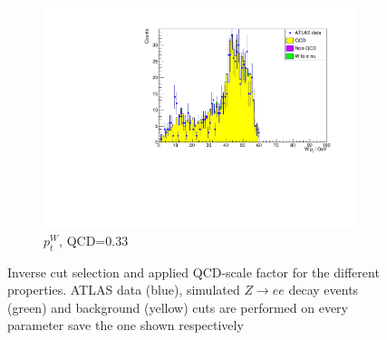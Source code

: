 \documentclass[11pt,a4paper,notitlepage]{scrartcl}
\begin{document}
\begin{figure}[H]
\begin{subfigure}{0.49\linewidth}
		\includegraphics[width=\linewidth]{P1_pics/cuts/ptw_qcd_033.pdf}
		\caption{$p_{t}^W$, QCD=$0.33$}
	\end{subfigure}
	\caption{Inverse cut selection and applied QCD-scale factor for the different properties. ATLAS data (blue), simulated $Z\to ee$ decay events (green) and background (yellow) cuts are performed on every parameter save the one shown respectively}\label{fig:QCD}
\end{figure}
\end{document}
